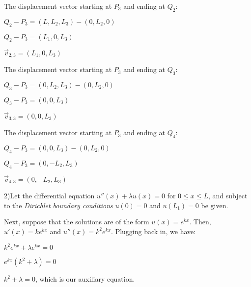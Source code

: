 \documentclass[12pt, executivepaper]{article}
\begin{document}
\begin{flushleft}
\vspace{5mm}

The displacement vector starting at $P_{3}$ and ending at $Q_{2}$:

\begin{center}

$Q_{2}-P_{3}=(L, L_{2}, L_{3})-(0, L_{2}, 0)$

$Q_{2}-P_{3}=(L_{1}, 0, L_{3})$

$\vec v_{2,3}=(L_{1}, 0, L_{3})$

\end{center}

\vspace{5mm}

The displacement vector starting at $P_{3}$ and ending at $Q_{3}$:

\begin{center}

$Q_{3}-P_{3}=(0, L_{2}, L_{3})-(0, L_{2}, 0)$

$Q_{3}-P_{3}=(0, 0, L_{3})$

$\vec v_{3,3}=(0, 0, L_{3})$

\end{center}

\vspace{5mm}

The displacement vector starting at $P_{3}$ and ending at $Q_{4}$:

\begin{center}

$Q_{4}-P_{3}=(0, 0, L_{3})-(0, L_{2}, 0)$

$Q_{4}-P_{3}=(0, -L_{2}, L_{3})$

$\vec v_{4,3}=(0, -L_{2}, L_{3})$

\end{center}

\end{flushleft}

\pagebreak

\vspace*{-40mm}

\begin{flushleft}

2)Let the differential equation $u''(x)+\lambda u(x)=0$ for $0 \leq x \leq L$, and subject to the \textit{Dirichlet boundary conditions} $u(0)=0$ and $u(L_{1})=0$ be given.

\vspace{3mm}

Next, suppose that the solutions are of the form $u(x)=e^{kx}$. Then, $u'(x)=ke^{kx}$ and $u''(x)=k^2e^{kx}$. Plugging back in, we have:

\begin{center}

$k^2e^{kx}+ \lambda e^{kx}=0$

$e^{kx}(k^2+ \lambda)=0$

$k^2+ \lambda=0$, which is our auxiliary equation.

\end{center}

\end{flushleft}
\end{document}
